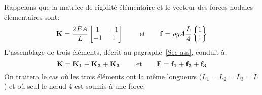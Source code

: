 Rappelons que la matrice de rigidité élémentaire et le vecteur des forces nodales élémentaires sont:
\begin{equation} \MM{K} = \frac{2EA}L \MM*{1 & -1\\ -1& 1} %
\qquad \text{ et} \qquad
\VV{f} = \rho g A \frac{L}4 \VV*{1 \\1} \end{equation}
\medskipvm
L'assemblage de trois éléments, décrit au pagraphe~\ref{Sec-ass}, conduit à:
\begin{equation} \MM{K}=\MM{K_1}+\MM{K_2}+\MM{K_3} \qquad \text{ et} \qquad \VV{F}=\VV{f_1}+\VV{f_2}+\VV{f_3} \end{equation}
\medskipvm
On traitera le cas où les trois éléments ont la même longueurs ($L_1=L_2=L_3=L$) et où seul le nœud 4 est
soumis à une force.
